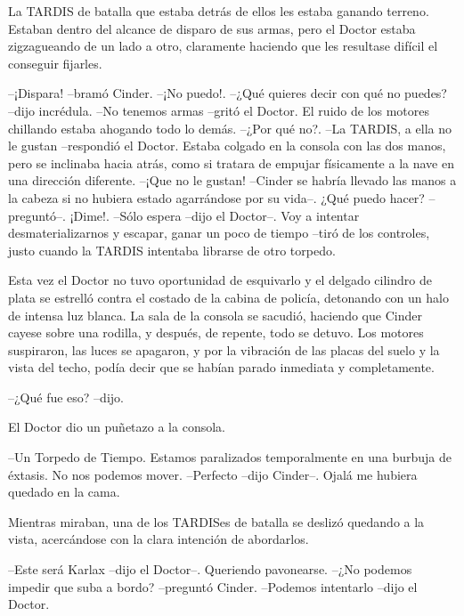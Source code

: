 La TARDIS de batalla que estaba detrás de ellos les estaba ganando terreno. Estaban dentro del alcance de disparo de sus armas, pero el Doctor estaba zigzagueando de un lado a otro, claramente haciendo que les resultase difícil el conseguir fijarles.

--¡Dispara! --bramó Cinder.
--¡No puedo!.
--¿Qué quieres decir con qué no puedes? --dijo incrédula.
--No tenemos armas --gritó el Doctor. El ruido de los motores chillando estaba ahogando todo lo demás.
--¿Por qué no?.
--La TARDIS, a ella no le gustan --respondió el Doctor. Estaba colgado en la consola con las dos manos, pero se inclinaba hacia atrás, como si tratara de empujar físicamente a la nave en una dirección diferente.
--¡Que no le gustan! --Cinder se habría llevado las manos a la cabeza si no hubiera estado agarrándose por su vida--. ¿Qué puedo hacer? --preguntó--. ¡Dime!.
--Sólo espera --dijo el Doctor--. Voy a intentar desmaterializarnos y escapar, ganar un poco de tiempo --tiró de los controles, justo cuando la TARDIS intentaba librarse de otro torpedo.

Esta vez el Doctor no tuvo oportunidad de esquivarlo y el delgado cilindro de plata se estrelló contra el costado de la cabina de policía, detonando con un halo de intensa luz blanca.
La sala de la consola se sacudió, haciendo que Cinder cayese sobre una rodilla, y después, de repente, todo se detuvo. Los motores suspiraron, las luces se apagaron, y por la vibración de las placas del suelo y la vista del techo, podía decir que se habían parado inmediata y completamente.

--¿Qué fue eso? --dijo.

El Doctor dio un puñetazo a la consola. 

--Un Torpedo de Tiempo. Estamos paralizados temporalmente en una burbuja de éxtasis. No nos podemos mover.
--Perfecto --dijo Cinder--. Ojalá me hubiera quedado en la cama.

Mientras miraban, una de los TARDISes de batalla se deslizó quedando a la vista, acercándose con la clara intención de abordarlos. 

--Este será Karlax --dijo el Doctor--. Queriendo pavonearse.
--¿No podemos impedir que suba a bordo? --preguntó Cinder.
--Podemos intentarlo --dijo el Doctor.

